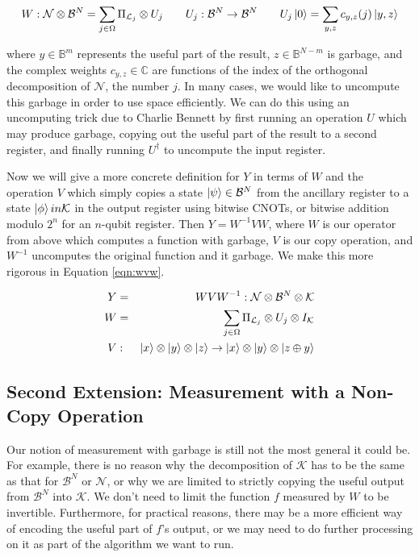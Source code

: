 \begin{equation}
W: \mathcal{N} \otimes \mathcal{B}^N =
\sum_{j \in \Omega} \Pi_{\mathcal{L}_j} \otimes U_j \qquad
U_j : \mathcal{B}^N \rightarrow \mathcal{B}^N \qquad
U_j\left\vert{0}\right\rangle = \sum_{y,z} c_{y,z}(j)\left\vert{y,z}\right\rangle
\end{equation}

where $y \in \mathbb{B}^m$ represents the useful part of the result,
$z \in \mathbb{B}^{N-m}$ is garbage, and the complex weights
$c_{y,z} \in \mathbb{C}$
are functions of the index of the orthogonal decomposition of $\mathcal{N}$,
the number $j$. In many cases, we would like to uncompute this garbage in
order to use space efficiently.
We can do this using an uncomputing trick due to Charlie Bennett
\cite{Bennett1973} by first running an operation $U$ which may produce
garbage, copying out the useful part of the result to a
second register, and finally running $U^{\dagger}$ to uncompute the
input register.

Now we will give a more concrete definition for $Y$ in terms of
$W$ and the operation $V$ which simply copies a state $\left\vert{\psi}\right\rangle \in \mathcal{B}^N$
from the ancillary register to a state $\left\vert{\phi}\right\rangle in \mathcal{K}$ in the
output register using bitwise CNOTs, or bitwise addition modulo $2^n$ for an
$n$-qubit register. Then $Y = W^{-1}VW$, where $W$ is our operator from above
which computes a function with garbage, $V$ is our copy operation, and
$W^{-1}$ uncomputes the original function and it garbage. We make this
more rigorous in Equation \ref{eqn:wvw}.

\begin{eqnarray}
Y & = & WVW^{-1} : \mathcal{N} \otimes \mathcal{B}^N \otimes \mathcal{K} \\
W & = &
\sum_{j \in \Omega} \Pi_{\mathcal{L}_j} \otimes U_j \otimes I_{\mathcal{K}}\\
V & : & \left\vert{x}\right\rangle \otimes \left\vert{y}\right\rangle \otimes \left\vert{z}\right\rangle \rightarrow \left\vert{x}\right\rangle \otimes \left\vert{y}\right\rangle \otimes \left\vert{z \oplus y}\right\rangle
\label{eqn:wvw}
\end{eqnarray}

\subsection{Second Extension: Measurement with a Non-Copy Operation}
\label{subsec:non-copy}

Our notion of measurement with garbage is still not the most general it could be.
For example, there is no reason why the decomposition of $\mathcal{K}$ has to
be the same as that for $\mathcal{B}^N$ or $\mathcal{N}$, or why we are limited
to strictly copying the useful output from $\mathcal{B}^N$ into $\mathcal{K}$.
We don't need to limit the function $f$ measured by $W$ to be invertible.
Furthermore, for practical reasons, there may be a more efficient way of encoding
the useful part of $f$'s output, or we may need to do further processing on it
as part of the algorithm we want to run.

